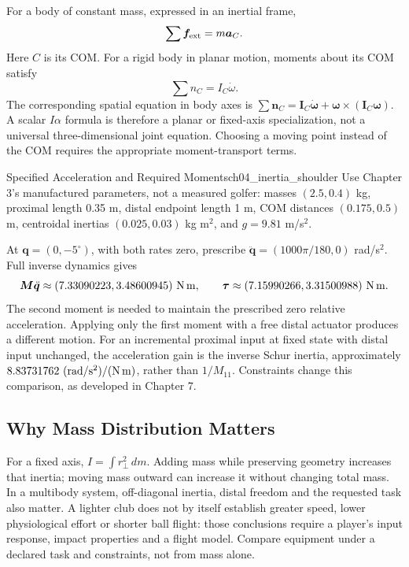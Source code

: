 For a body of constant mass, expressed in an inertial frame,
\begin{equation}
\sum\bm f_{\rm ext}=m\bm a_C.
\label{eq:ch04_newton}
\end{equation}
Here \(C\) is its COM. For a rigid body in planar motion, moments about its COM satisfy
\begin{equation}
\sum n_C=I_C\dot\omega.
\label{eq:ch04_newton_rot}
\end{equation}
The corresponding spatial equation in body axes is \(\sum\bm n_C=\bm I_C\dot{\bm\omega}+\bm\omega\times(\bm I_C\bm\omega)\). A scalar \(I\alpha\) formula is therefore a planar or fixed-axis specialization, not a universal three-dimensional joint equation. Choosing a moving point instead of the COM requires the appropriate moment-transport terms.

\begin{example}{Specified Acceleration and Required Moments}{ch04_inertia_shoulder}
Use Chapter 3's manufactured parameters, not a measured golfer: masses \((2.5,0.4)\) kg, proximal length 0.35 m, distal endpoint length 1 m, COM distances \((0.175,0.5)\) m, centroidal inertias \((0.025,0.03)\) kg m\(^2\), and \(g=9.81\) m/s\(^2\).

At \(\bm q=(0,-5^\circ)\), with both rates zero, prescribe \(\ddot{\bm q}=(1000\pi/180,0)\) rad/s\(^2\). Full inverse dynamics gives
\[
\bm M\ddot{\bm q}\approx(7.33090223,3.48600945)\ {\rm N\,m},\qquad
\bm\tau\approx(7.15990266,3.31500988)\ {\rm N\,m}.
\]
The second moment is needed to maintain the prescribed zero relative acceleration. Applying only the first moment with a free distal actuator produces a different motion. For an incremental proximal input at fixed state with distal input unchanged, the acceleration gain is the inverse Schur inertia, approximately \(8.83731762\ ({\rm rad/s^2})/({\rm N\,m})\), rather than \(1/M_{11}\). Constraints change this comparison, as developed in Chapter 7.
\end{example}

\subsection*{Why Mass Distribution Matters}

For a fixed axis, \(I=\int r_\perp^2\,dm\). Adding mass while preserving geometry increases that inertia; moving mass outward can increase it without changing total mass. In a multibody system, off-diagonal inertia, distal freedom and the requested task also matter. A lighter club does not by itself establish greater speed, lower physiological effort or shorter ball flight: those conclusions require a player's input response, impact properties and a flight model. Compare equipment under a declared task and constraints, not from mass alone.

